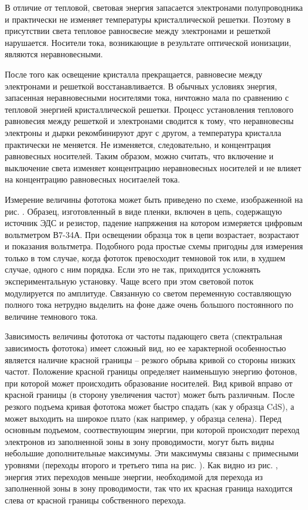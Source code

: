 \documentclass[a4paper, 12pt]{article}
\begin{document}
	В отличие от тепловой, световая энергия запасается электронами полупроводника и практически не изменяет температуры кристаллической решетки. Поэтому в присутствии света тепловое равносвесие между электронами и решеткой нарушается. Носители тока, возникающие в результате оптической ионизации, являются неравновесными.

	После того как освещение кристалла прекращается, равновесие между электронами и решеткой восстанавливается. В обычных условиях энергия, запасенная неравновесными носителями тока, ничтожно мала по сравнению с тепловой энергией кристаллической решетки. Процесс установления теплового равновесия между решеткой и электронами сводится к тому, что неравновесны электроны и дырки рекомбинируют друг с другом, а температура кристалла практически не меняется. Не изменяется, следовательно, и концентрация равновесных носителей. Таким образом, можно считать, что включение и выключение света изменяет концентрацию неравновесных носителей и не влияет на концентрацию равновесных носитаелей тока.

	Измерение величины фототока может быть приведено по схеме, изображенной на рис. . Образец, изготовленный в виде пленки, включен в цепь, содержащую источник ЭДС и резистор, падение напряжения на котором измеряется цифровым вольтметром В7-34А. При освещении образца ток в цепи возрастает, возрастают и показания вольтметра. Подобного рода простые схемы пригодны для измерения только в том случае, когда фототок превосходит темновой ток или, в худшем случае, одного с ним порядка. Если это не так, приходится усложнять экспериментальную установку. Чаще всего при этом световой поток модулируется по амплитуде. Связанную со светом переменную составляющую полного тока нетрудно выделить на фоне даже очень большого постоянного по величине темнового тока.

	Зависимость величины фототока от частоты падающего света (спектральная зависимость фототока) имеет сложный вид, но ее характерной особенностью является наличие красной границы -- резкого обрыва кривой со стороны низких частот. Положение красной границы определяет наименьшую энергию фотонов, при которой может происходить образование носителей. Вид кривой вправо от красной границы (в сторону увеличения частот) может быть различным. После резкого подъема кривая фототока может быстро спадать (как у образца CdS), а может выходить на широкое плато (как например, у образца селена). Перед основным подъемом, соотвествующим энергии, при которой происходит переход электронов из заполненной зоны в зону проводимости, могут быть видны небольшие дополнительные максимумы. Эти максимумы связаны с примесными уровнями (переходы второго и третьего типа на рис. ). Как видно из рис. , энергия этих переходов меньше энергии, необходимой для перехода из заполненной зоны в зону проводимости, так что их красная граница находится слева от красной границы собственного перехода.
\end{document}
